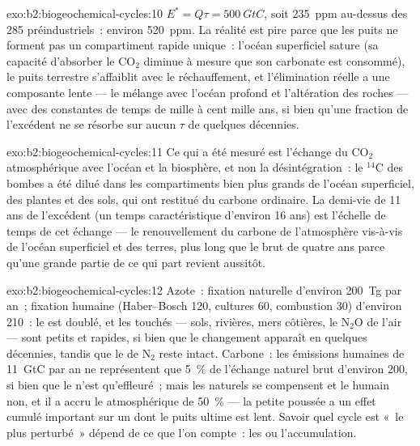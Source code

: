 \begin{solution}{exo:b2:biogeochemical-cycles:10}
$E^{*} = Q\tau = \qty{500}{GtC}$, soit \qty{235}{ppm} au-dessus des 285
préindustriels~: environ \qty{520}{ppm}. La réalité est pire parce que les
puits ne forment pas un compartiment rapide unique~: l'océan superficiel
sature (sa capacité d'absorber le $\mathrm{CO_2}$ diminue à mesure que son
carbonate est consommé), le puits terrestre s'affaiblit avec le
réchauffement, et l'élimination réelle a une composante lente --- le
mélange avec l'océan profond et l'altération des roches --- avec des
constantes de temps de mille à cent mille ans, si bien qu'une fraction
de l'excédent ne se résorbe sur aucun $\tau$ de quelques décennies.
\end{solution}

\begin{solution}{exo:b2:biogeochemical-cycles:11}
Ce qui a été mesuré est l'échange du $\mathrm{CO_2}$ atmosphérique avec
l'océan et la biosphère, et non la désintégration~: le $\mathrm{{}^{14}C}$ des
bombes a été dilué dans les compartiments bien plus grands de l'océan
superficiel, des plantes et des sols, qui ont restitué du carbone
ordinaire. La demi-vie de 11 ans de l'excédent (un temps caractéristique
d'environ 16 ans) est l'échelle de temps de cet échange --- le
renouvellement du carbone de l'atmosphère vis-à-vis de l'océan
superficiel et des terres, plus long que le  brut de
quatre ans parce qu'une grande partie de ce qui part revient aussitôt.
\end{solution}

\begin{solution}{exo:b2:biogeochemical-cycles:12}
Azote~: fixation naturelle d'environ 200~Tg par an~; fixation humaine
(Haber--Bosch 120, cultures 60, combustion 30) d'environ 210~: le  est
doublé, et les  touchés --- sols, rivières, mers côtières, le
$\mathrm{N_2O}$ de l'air --- sont petits et rapides, si bien que le changement
apparaît en quelques décennies, tandis que le  de $\mathrm{N_2}$ reste
intact. Carbone~: les émissions humaines de 11~GtC par an ne représentent
que \qty{5}{\%} de l'échange naturel brut d'environ 200, si bien que le
 n'est qu'effleuré~; mais les  naturels se compensent et le 
humain non, et il a accru le  atmosphérique de \qty{50}{\%} ---
la petite poussée a un effet cumulé important sur un  dont le
puits ultime est lent. Savoir quel cycle est «~le plus perturbé~» dépend
de ce que l'on compte~: les  ou l'accumulation.
\end{solution}

